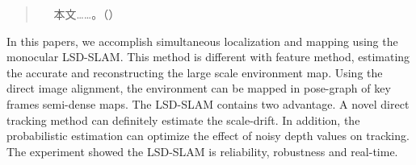 

\begin{abstract}
　
本文……。（{\color{blue}{摘要是一篇具有独立性和完整性的短文，应概括而扼要地反映出本论文的主要内容。包括研究目的、研究方法、研究结果和结论等，特别要突出研究结果和结论。中文摘要力求语言精炼准确，硕士学位论文摘要建议500$\sim$800字，博士学位论文建议1000$\sim$1200字。摘要中不可出现参考文献、图、表、化学结构式、非公知公用的符号和术语。英文摘要与中文摘要的内容应一致。}}）


\end{abstract}

\begin{englishabstract}

   In this papers, we accomplish simultaneous localization and mapping using the monocular LSD-SLAM. This method is different with feature method, estimating the accurate and reconstructing the large scale environment map. Using the direct image alignment, the environment can be mapped in pose-graph of key frames semi-dense maps. The LSD-SLAM contains two advantage. A novel direct tracking method can definitely estimate the scale-drift. In addition, the probabilistic estimation can optimize the effect of noisy depth values on tracking. The experiment showed the LSD-SLAM is reliability, robustness and real-time.
   

\end{englishabstract}

